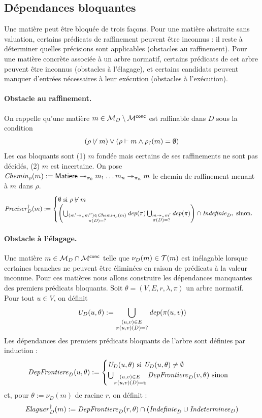 \documentclass[review]{jflart}
\begin{document}
\subsection{Dépendances bloquantes}\label{sec:dependances-bloquantes}

Une matière peut être bloquée de trois façons. Pour une matière abstraite
sans valuation, certains prédicats de raffinement peuvent être inconnus :
il reste à déterminer quelles précisions sont applicables (obstacles au raffinement). Pour une matière
concrète associée à un arbre normatif, certains prédicats de cet arbre
peuvent être inconnus (obstacles à l'élagage), et certains candidats peuvent manquer d'entrées
nécessaires à leur exécution (obstacles à l'exécution).
\paragraph{Obstacle au raffinement.}
On rappelle qu'une matière $m\in\mathcal{M}_D\setminus\mathcal{M}^{\mathsf{conc}}$ est raffinable dans $D$ sous la condition 
\[
(\rho\not\vdash m) \vee (\rho\vdash m \wedge \rho_{\mathord{?}}(m)=\emptyset)
\]
Les cas bloquants sont (1) $m$ fondée mais certains de ses raffinements ne sont pas décidés, (2) $m$ est incertaine. On pose $\mathit{Chemin}_\rho(m):=\mathsf{Matiere}\mathrel{\twoheadrightarrow_{\pi_0}}m_1\dots m_n\mathrel{\twoheadrightarrow_{\pi_n}}m$ le chemin de raffinement menant à $m$ dans $\rho$.
\[
\mathit{Preciser}^\dagger_D(m) := \begin{cases}
\emptyset\hbox{ si } \rho\not\vdash m \\
\left(\bigcup_{\substack{(m'\mathrel{\twoheadrightarrow_{\pi}} m'')\in\mathit{Chemin}_\rho(m) \\ \pi(D)=\mathord{?}}} \mathit{dep}(\pi) 
\bigcup_{\substack{m\mathrel{\twoheadrightarrow_{\pi}} m'\\ \pi(D)=\mathord{?}}}
\mathit{dep}(\pi)\right) \cap \mathit{Indefinie}_D, \hbox{ sinon.}
\end{cases}
\]

\paragraph{Obstacle à l'élagage.}
Une matière $m\in\mathcal{M}_D\cap\mathcal{M}^{\mathsf{conc}}$ telle que $\nu_D(m)\in\mathcal{T}(m)$ est inélagable lorsque certaines branches ne peuvent être éliminées en raison de prédicats à la valeur inconnue.
Pour ces matières nous allons construire les dépendances manquantes des premiers prédicats bloquants. Soit $\theta=(V,E,r,\lambda,\pi)$ un arbre normatif. Pour tout $u\in V$, on définit
\[
\mathit{U}_D(u,\theta) := \bigcup_{\substack{(u,v)\in E \\ \pi(u,v)(D)=\mathord{?}}} \mathit{dep}(\pi(u,v)) 
\]
Les dépendances des premiers prédicats bloquants de l'arbre sont définies par induction :
\[
\mathit{DepFrontiere}_D(u,\theta) := \begin{cases}  \mathit{U}_D(u,\theta) \hbox{ si } \mathit{U}_D(u,\theta) \neq\emptyset \\ 
\bigcup_{\substack{(u,v)\in E \\ \pi(u,v)(D)={\mathsf{t\!t}}}} \mathit{DepFrontiere}_D(v,\theta) \hbox{ sinon} \end{cases}
\]
et, pour $\theta:=\nu_D(m)$ de racine $r$, on définit :
\[
\mathit{Elaguer}^\dagger_D(m) := \mathit{DepFrontiere}_D(r,\theta) \cap (\mathit{Indefinie}_D\cup\mathit{Indeterminee}_D)
\]
\end{document}

